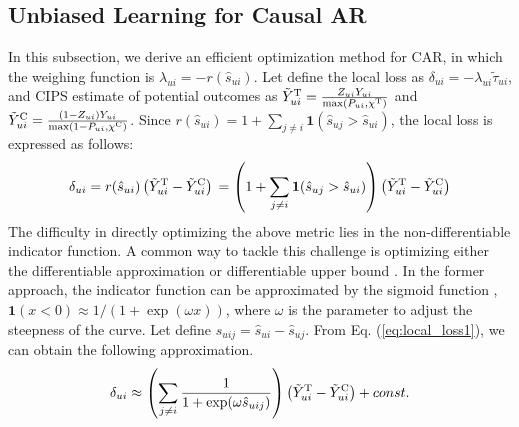 \documentclass[manuscript,screen]{acmart}
\begin{document}
\subsection{Unbiased Learning for Causal AR}
\label{subsec:unbiased_learning}
In this subsection, we derive an efficient optimization method for CAR, in which the weighing function is $\lambda_{ui} = -r(\hat{s}_{ui})$.
Let define the local loss as $\delta_{ui} = -\lambda_{ui} \tilde{\tau}_{ui}$, and CIPS estimate of potential outcomes as $\tilde{Y}_{ui}^\textnormal{T} = \frac{Z_{ui} Y_{ui}}{\max(P_{ui}, \chi^\textnormal{T})}$ and $\tilde{Y}_{ui}^\textnormal{C} = \frac{(1-Z_{ui}) Y_{ui}}{\max(1-P_{ui}, \chi^\textnormal{C})}$.
Since $r (\hat{s}_{ui}) = 1 + \sum_{j \neq i} \boldsymbol{1}(\hat{s}_{uj} > \hat{s}_{ui})$, the local loss is expressed as follows:
\begin{equation}
\label{eq:local_loss1}
\delta_{ui} 
= r (\hat{s}_{ui}) \left(\tilde{Y}_{ui}^\textnormal{T} - \tilde{Y}_{ui}^\textnormal{C} \right) \nonumber \\
= \left(1 + \sum_{j \neq i} \boldsymbol{1}(\hat{s}_{uj} > \hat{s}_{ui})\right) \left(\tilde{Y}_{ui}^\textnormal{T} - \tilde{Y}_{ui}^\textnormal{C} \right)
\end{equation}
The difficulty in directly optimizing the above metric lies in the non-differentiable indicator function.
A common way to tackle this challenge is optimizing either the differentiable approximation or differentiable upper bound \cite{Liu09}.
In the former approach, the indicator function can be approximated by the sigmoid function \cite{Qin10,Yan03}, $\boldsymbol{1}(x < 0) \approx 1/(1+\exp(\omega x))$, where $\omega$ is the parameter to adjust the steepness of the curve.
Let define $\hat{s}_{uij} = \hat{s}_{ui} - \hat{s}_{uj}$.
From Eq. (\ref{eq:local_loss1}), we can obtain the following approximation.
\begin{equation}
\label{eq:approximation}
\delta_{ui} \approx \left( \sum_{j \neq i} \frac{1}{1+\exp(\omega \hat{s}_{uij})} \right) \left( \tilde{Y}_{ui}^\textnormal{T} - \tilde{Y}_{ui}^\textnormal{C}\right) + const.
\end{equation}
\end{document}
